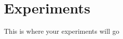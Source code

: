 \documentclass[./dissertation.tex]{subfiles}
\begin{document}
    \chapter{Experiments}
    This is where your experiments will go
\end{document}
